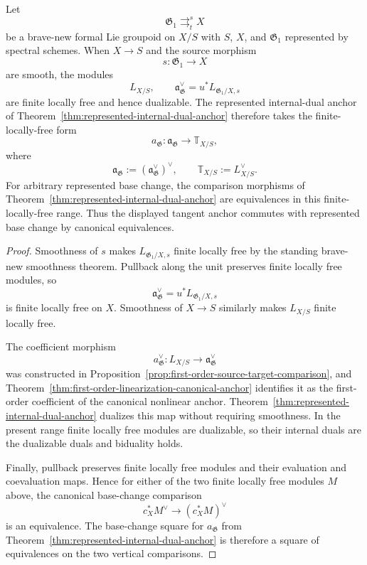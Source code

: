 \begin{theorem}
\label{thm:represented-first-order-anchor}
Let
\[
    \mathfrak G_1
    \mathop{\rightrightarrows}^{s}_{t}
    X
\]
be a brave-new formal Lie groupoid on $X/S$ with $S$, $X$, and
$\mathfrak G_1$ represented by spectral schemes.  When $X\to S$ and the
source morphism
\[
    s:\mathfrak G_1\to X
\]
are smooth, the modules
\[
    L_{X/S},
    \qquad
    \mathfrak a_{\mathfrak G}^{\vee}
    =
    u^*L_{\mathfrak G_1/X,s}
\]
are finite locally free and hence dualizable.  The represented internal-dual
anchor of Theorem~\ref{thm:represented-internal-dual-anchor} therefore takes
the finite-locally-free form
\[
\boxed{
    a_{\mathfrak G}:
    \mathfrak a_{\mathfrak G}
    \longrightarrow
    \mathbb T_{X/S},
}
\]
where
\[
    \mathfrak a_{\mathfrak G}
    :=
    \left(
        \mathfrak a_{\mathfrak G}^{\vee}
    \right)^{\vee},
    \qquad
    \mathbb T_{X/S}
    :=
    L_{X/S}^{\vee}.
\]
For arbitrary represented base change, the comparison morphisms of
Theorem~\ref{thm:represented-internal-dual-anchor} are equivalences in this
finite-locally-free range.  Thus the displayed tangent anchor commutes with
represented base change by canonical equivalences.
\end{theorem}

\begin{proof}
Smoothness of $s$ makes
$L_{\mathfrak G_1/X,s}$ finite locally free by the standing brave-new
smoothness theorem.  Pullback along the unit preserves finite locally free
modules, so
\[
    \mathfrak a_{\mathfrak G}^{\vee}
    =
    u^*L_{\mathfrak G_1/X,s}
\]
is finite locally free on $X$.  Smoothness of $X\to S$ similarly makes
$L_{X/S}$ finite locally free.

The coefficient morphism
\[
    a_{\mathfrak G}^{\vee}:
    L_{X/S}
    \longrightarrow
    \mathfrak a_{\mathfrak G}^{\vee}
\]
was constructed in
Proposition~\ref{prop:first-order-source-target-comparison}, and
Theorem~\ref{thm:first-order-linearization-canonical-anchor} identifies it as
the first-order coefficient of the canonical nonlinear anchor.
Theorem~\ref{thm:represented-internal-dual-anchor} dualizes this map without
requiring smoothness.  In the present range finite locally free modules are
dualizable, so their internal duals are the dualizable duals and biduality
holds.

Finally, pullback preserves finite locally free modules and their evaluation
and coevaluation maps.  Hence for either of the two finite locally free
modules $M$ above, the canonical base-change comparison
\[
    c_X^*M^\vee\longrightarrow(c_X^*M)^\vee
\]
is an equivalence.  The base-change square for $a_{\mathfrak G}$ from
Theorem~\ref{thm:represented-internal-dual-anchor} is therefore a square of
equivalences on the two vertical comparisons.
\end{proof}

